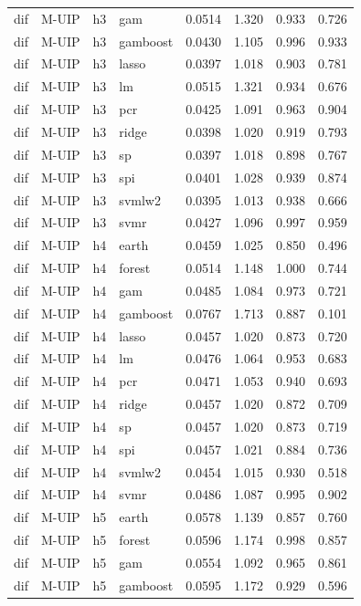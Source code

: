 \begin{ThreePartTable}
\begin{longtable}[t]{llclcccc}
dif & M-UIP & h3 & gam & 0.0514 & 1.320 & 0.933 & 0.726\\
dif & M-UIP & h3 & gamboost & 0.0430 & 1.105 & 0.996 & 0.933\\
dif & M-UIP & h3 & lasso & 0.0397 & 1.018 & 0.903 & 0.781\\
dif & M-UIP & h3 & lm & 0.0515 & 1.321 & 0.934 & 0.676\\
dif & M-UIP & h3 & pcr & 0.0425 & 1.091 & 0.963 & 0.904\\
dif & M-UIP & h3 & ridge & 0.0398 & 1.020 & 0.919 & 0.793\\
dif & M-UIP & h3 & sp & 0.0397 & 1.018 & 0.898 & 0.767\\
dif & M-UIP & h3 & spi & 0.0401 & 1.028 & 0.939 & 0.874\\
dif & M-UIP & h3 & svmlw2 & 0.0395 & 1.013 & 0.938 & 0.666\\
dif & M-UIP & h3 & svmr & 0.0427 & 1.096 & 0.997 & 0.959\\
\addlinespace
dif & M-UIP & h4 & earth & 0.0459 & 1.025 & 0.850 & 0.496\\
dif & M-UIP & h4 & forest & 0.0514 & 1.148 & 1.000 & 0.744\\
dif & M-UIP & h4 & gam & 0.0485 & 1.084 & 0.973 & 0.721\\
dif & M-UIP & h4 & gamboost & 0.0767 & 1.713 & 0.887 & 0.101\\
dif & M-UIP & h4 & lasso & 0.0457 & 1.020 & 0.873 & 0.720\\
dif & M-UIP & h4 & lm & 0.0476 & 1.064 & 0.953 & 0.683\\
dif & M-UIP & h4 & pcr & 0.0471 & 1.053 & 0.940 & 0.693\\
dif & M-UIP & h4 & ridge & 0.0457 & 1.020 & 0.872 & 0.709\\
dif & M-UIP & h4 & sp & 0.0457 & 1.020 & 0.873 & 0.719\\
dif & M-UIP & h4 & spi & 0.0457 & 1.021 & 0.884 & 0.736\\
dif & M-UIP & h4 & svmlw2 & 0.0454 & 1.015 & 0.930 & 0.518\\
dif & M-UIP & h4 & svmr & 0.0486 & 1.087 & 0.995 & 0.902\\
\addlinespace
dif & M-UIP & h5 & earth & 0.0578 & 1.139 & 0.857 & 0.760\\
dif & M-UIP & h5 & forest & 0.0596 & 1.174 & 0.998 & 0.857\\
dif & M-UIP & h5 & gam & 0.0554 & 1.092 & 0.965 & 0.861\\
dif & M-UIP & h5 & gamboost & 0.0595 & 1.172 & 0.929 & 0.596\\

\end{longtable}
\end{ThreePartTable}
